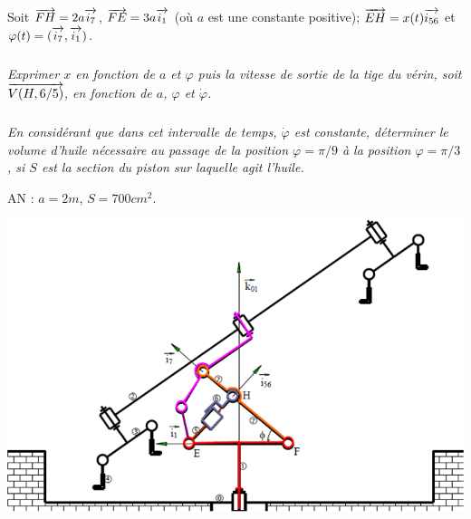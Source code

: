 \documentclass[10pt]{article}
\begin{document}
Soit $\overrightarrow{FH}=2a\overrightarrow{i_7}$, $\overrightarrow{FE}=3a\overrightarrow{i_1}$ (où $a$ est une constante positive); $\overrightarrow{EH}=x(t)\overrightarrow{i_{56}}$ et $\varphi(t)=(\overrightarrow{i_7},\overrightarrow{i_1})$.

\subparagraph{}
\textit{Exprimer $x$ en fonction de $a$ et $\varphi$ puis la vitesse de sortie de la tige du vérin, soit $\overrightarrow{V(H,6/5)}$, en fonction de $a$, $\varphi$ et $\dot{\varphi}$.}


\subparagraph{}
\textit{En considérant que dans cet intervalle de temps, $\dot{\varphi}$ est constante, déterminer le volume d'huile nécessaire au passage de la position $\varphi=\pi/9$ à la position $\varphi=\pi/3$, si $S$ est la section du piston sur laquelle agit l'huile.}


AN : $a=2m$, $S=700cm^2$.

\begin{center}
 \includegraphics[width=\textwidth]{images/exo3}
\end{center}
\end{document}
